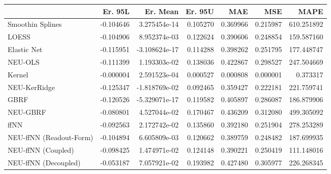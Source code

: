 \begin{tabular}{lrrrrrr}
\toprule
{} &   Er. 95L &      Er. Mean &   Er. 95U &       MAE &       MSE &        MAPE \\
\midrule
Smoothin Splines        & -0.104646 &  3.275454e-14 &  0.105270 &  0.369966 &  0.215987 &  610.251892 \\
LOESS                   & -0.104906 &  8.952374e-03 &  0.122624 &  0.390606 &  0.248854 &  159.587160 \\
Elastic Net             & -0.115951 & -3.108624e-17 &  0.114288 &  0.398262 &  0.251795 &  177.448747 \\
NEU-OLS                 & -0.111399 &  1.193303e-02 &  0.138036 &  0.422867 &  0.298527 &  247.504669 \\
Kernel                  & -0.000004 &  2.591523e-04 &  0.000527 &  0.000808 &  0.000001 &    0.373317 \\
NEU-KerRidge            & -0.125347 & -1.818769e-02 &  0.092465 &  0.359427 &  0.222181 &  221.759741 \\
GBRF                    & -0.120526 & -5.329071e-17 &  0.119582 &  0.405897 &  0.286087 &  186.879906 \\
NEU-GBRF                & -0.080801 &  4.527044e-02 &  0.170467 &  0.436209 &  0.312080 &  499.305092 \\
ffNN                    & -0.092563 &  2.172742e-02 &  0.135860 &  0.392180 &  0.251904 &  278.253289 \\
NEU-ffNN (Readout-Form) & -0.104894 &  6.605809e-03 &  0.120662 &  0.389759 &  0.248482 &  187.699935 \\
NEU-ffNN (Coupled)      & -0.098425 &  1.474971e-02 &  0.124148 &  0.390221 &  0.250419 &  111.148016 \\
NEU-ffNN (Decoupled)    & -0.053187 &  7.057921e-02 &  0.193982 &  0.427480 &  0.305977 &  226.268345 \\
\bottomrule
\end{tabular}
